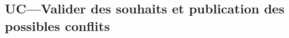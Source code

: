 \begin{comment}
 \subsubsection{Conflit entre deux enseignants - résolution par le chef de département}
 \begin{figure}[!htbp]
 \begin{center}
 \texttt{[image: fig/scenario1.jpg]}
 \caption{Scénario : conflit entre deux enseignants - résolution par le chef de département}
 \end{center}
 \end{figure}

Dans ce scénario, le conflit est réglé par le chef de département qui affecte l'enseignement à un seul des deux enseignants (la demande de l'autre enseignant est alors considérée comme étant refusée).

 \subsubsection{Conflit entre deux enseignants - résolution par un des enseignants}
 \begin{figure}[!htbp]
 \begin{center}
 \texttt{[image: fig/scenario2.jpg]}
 \caption{Scénario : conflit entre deux enseignants - résolution par un des enseignants}
 \end{center}
 \end{figure}

 Dans ce scénario, le conflit est réglé par un des deux enseignants qui annule son vœu concernant l'enseignement à l'origine du conflit.  

\end{comment}

\subsection{UC---Valider des souhaits et publication des possibles conflits}

